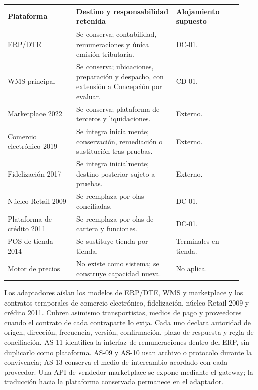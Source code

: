 \documentclass[11pt]{article}
\begin{document}
\begin{longtable}{@{}p{0.27\linewidth}p{0.39\linewidth}p{0.26\linewidth}@{}}
\toprule Plataforma & Destino y responsabilidad retenida & Alojamiento supuesto \\
\midrule\endhead\bottomrule\endlastfoot
ERP/DTE & Se conserva; contabilidad, remuneraciones y única emisión tributaria. & DC-01. \\
WMS principal & Se conserva; ubicaciones, preparación y despacho, con extensión a Concepción por evaluar. & CD-01. \\
Marketplace 2022 & Se conserva; plataforma de terceros y liquidaciones. & Externo. \\
Comercio electrónico 2019 & Se integra inicialmente; conservación, remediación o sustitución tras pruebas. & Externo. \\
Fidelización 2017 & Se integra inicialmente; destino posterior sujeto a pruebas. & Externo. \\
Núcleo Retail 2009 & Se reemplaza por olas conciliadas. & DC-01. \\
Plataforma de crédito 2011 & Se reemplaza por olas de cartera y funciones. & DC-01. \\
POS de tienda 2014 & Se sustituye tienda por tienda. & Terminales en tienda. \\
Motor de precios & No existe como sistema; se construye capacidad nueva. & No aplica. \\
\end{longtable}

Los adaptadores aíslan los modelos de ERP/DTE, WMS y marketplace y los contratos temporales de comercio electrónico, fidelización, núcleo Retail 2009 y crédito 2011. Cubren asimismo transportistas, medios de pago y proveedores cuando el contrato de cada contraparte lo exija. Cada uno declara autoridad de origen, dirección, frecuencia, versión, confirmación, plazo de respuesta y regla de conciliación. AS-11 identifica la interfaz de remuneraciones dentro del ERP, sin duplicarlo como plataforma. AS-09 y AS-10 usan archivo o protocolo durante la convivencia; AS-13 conserva el medio de intercambio acordado con cada proveedor. Una API de vendedor marketplace se expone mediante el gateway; la traducción hacia la plataforma conservada permanece en el adaptador.
\end{document}
